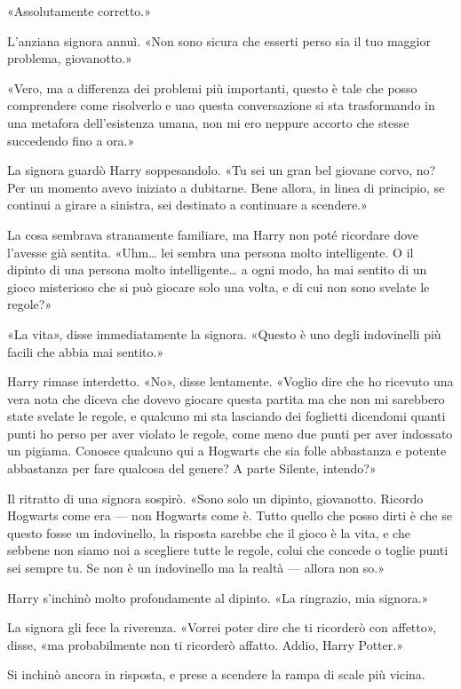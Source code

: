 «Assolutamente corretto.»

L’anziana signora annuì. «Non sono sicura che esserti perso sia il tuo maggior problema, giovanotto.»

«Vero, ma a differenza dei problemi più importanti, questo è tale che posso comprendere come risolverlo e uao questa conversazione si sta trasformando in una metafora dell’esistenza umana, non mi ero neppure accorto che stesse succedendo fino a ora.»

La signora guardò Harry soppesandolo. «Tu sei un gran bel giovane corvo, no? Per un momento avevo iniziato a dubitarne. Bene allora, in linea di principio, se continui a girare a sinistra, sei destinato a continuare a scendere.»

La cosa sembrava stranamente familiare, ma Harry non poté ricordare dove l’avesse già sentita. «Uhm… lei sembra una persona molto intelligente. O il dipinto di una persona molto intelligente… a ogni modo, ha mai sentito di un gioco misterioso che si può giocare solo una volta, e di cui non sono svelate le regole?»

«La vita», disse immediatamente la signora. «Questo è uno degli indovinelli più facili che abbia mai sentito.»

Harry rimase interdetto. «No», disse lentamente. «Voglio dire che ho ricevuto una vera nota che diceva che dovevo giocare questa partita ma che non mi sarebbero state svelate le regole, e qualcuno mi sta lasciando dei foglietti dicendomi quanti punti ho perso per aver violato le regole, come meno due punti per aver indossato un pigiama. Conosce qualcuno qui a Hogwarts che sia folle abbastanza e potente abbastanza per fare qualcosa del genere? A parte Silente, intendo?»

Il ritratto di una signora sospirò. «Sono solo un dipinto, giovanotto. Ricordo Hogwarts come era — non Hogwarts come è. Tutto quello che posso dirti è che se questo fosse un indovinello, la risposta sarebbe che il gioco è la vita, e che sebbene non siamo noi a scegliere tutte le regole, colui che concede o toglie punti sei sempre tu. Se non è un indovinello ma la realtà — allora non so.»

Harry s’inchinò molto profondamente al dipinto. «La ringrazio, mia signora.»

La signora gli fece la riverenza. «Vorrei poter dire che ti ricorderò con affetto», disse, «ma probabilmente non ti ricorderò affatto. Addio, Harry Potter.»

Si inchinò ancora in risposta, e prese a scendere la rampa di scale più vicina.

